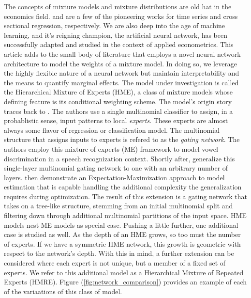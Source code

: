 \documentclass[12pt]{article}
\begin{document}
The concepts of mixture models and mixture distributions are old hat
in the economics field. \cite{Hamilton1989} and \cite{GoldfeldQuant1973}
are a few of the pioneering works for time series and cross sectional
regression, respectively. We are also deep into the age of machine
learning, and it's reigning champion, the artificial neural network, has
been successfully adapted and studied in the context of applied econometrics.
This article adds to the small body of literature that employs a novel
neural network architecture to model the weights of a mixture model. In doing
so, we leverage the highly flexible nature of a neural network but maintain
interpretability and the means to quantify marginal effects.
The model under investigation is called the Hierarchical Mixture
of Experts (HME), a class of mixture models whose defining feature is 
its conditional weighting scheme. The model's origin story traces back to \cite{JJNH1991}.
The authors use a single multinomial classifier to assign, in a probablistic
sense, input patterns to local \textit{experts}. These experts are
almost always some flavor of regression or classification model.
The multinomial structure that assigns inputs to experts is
refered to as the \textit{gating network}. The authors employ this
mixture of experts (ME) framework to model vowel discrimination in a speech
recognization context. Shortly after, \cite{JordanJacobs1992}
generalize this single-layer multinomial gating network to one with an arbitrary
number of layers. \cite{JordanJacobs1993} then demonstrate
an Expectation-Maximization approach to model estimation that is capable handling the additional complexity
the generalization requires during optimization. The result
of this extension is a gating network that takes on a tree-like structure,
stemming from an initial multinomial split and filtering down through additional
multinomial partitions of the input space. HME models nest ME models as special case.
Pushing a little further, one additional case is studied as well. As the depth of an HME
grows, so too must the number of experts. If we have a symmetric HME network,
this growth is geometric with respect to the network's depth. With this in mind,
a further extension can be considered where each expert is not unique, but a member of a fixed
set of experts. We refer to this additional model as a Hierarchical Mixture of Repeated
Experts (HMRE). Figure (\ref{fig:network_comparison}) provides an example
of each of the variaations of this class of model.

\bigskip
\end{document}
